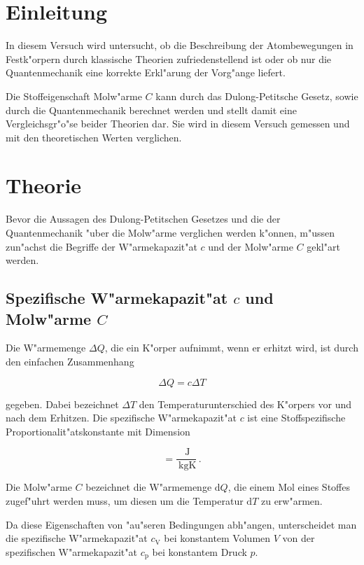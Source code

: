\section{Einleitung} %
\label{sec:einleitung}
	In diesem Versuch wird untersucht, ob die Beschreibung der Atombewegungen in Festk"orpern durch klassische Theorien zufriedenstellend ist oder ob nur die Quantenmechanik eine korrekte Erkl"arung der Vorg"ange liefert.

	Die Stoffeigenschaft Molw"arme $C$ kann durch das Dulong-Petitsche Gesetz, sowie durch die Quantenmechanik berechnet werden und stellt damit eine Vergleichsgr"o"se beider Theorien dar.
	Sie wird in diesem Versuch gemessen und mit den theoretischen Werten verglichen.

\section{Theorie} %
\label{sec:theorie}
	Bevor die Aussagen des Dulong-Petitschen Gesetzes und die der Quantenmechanik "uber die Molw"arme verglichen werden k"onnen, m"ussen zun"achst die Begriffe der W"armekapazit"at $c$ und der Molw"arme $C$ gekl"art werden.

	\subsection{Spezifische W"armekapazit"at $c$ und Molw"arme $C$}
	\label{subsec:waermekapazitaet}
		Die W"armemenge $\Delta Q$, die ein K"orper aufnimmt, wenn er erhitzt wird, ist durch den einfachen Zusammenhang

		\begin{equation*}
			\Delta Q = c \Delta T
		\end{equation*}

		gegeben. Dabei bezeichnet $\Delta T$ den Temperaturunterschied des K"orpers vor und nach dem Erhitzen. Die spezifische W"armekapazit"at $c$ ist eine Stoffspezifische Proportionalit"atskonstante mit Dimension

		\begin{equation*}
			[c] = \frac{\SI{}{\joule}}{\SI{}{\kilo \gram \kelvin}} \,.
		\end{equation*}

		Die Molw"arme $C$ bezeichnet die W"armemenge $\mathrm{d}Q$, die einem Mol eines Stoffes zugef"uhrt werden muss, um diesen um die Temperatur $\mathrm{d}T$ zu erw"armen.

		Da diese Eigenschaften von "au"seren Bedingungen abh"angen, unterscheidet man die spezifische W"armekapazit"at $c_\mathrm{V}$ bei konstantem Volumen $V$ von der spezifischen W"armekapazit"at $c_\mathrm{p}$ bei konstantem Druck $p$.

